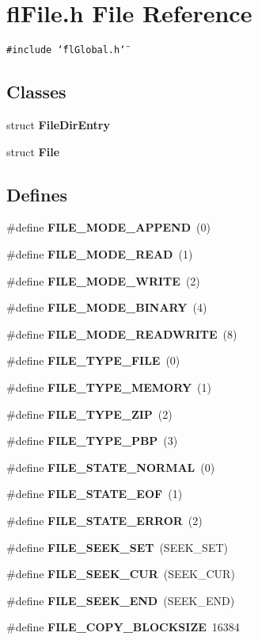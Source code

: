 \section{fl\-File.h File Reference}
\label{flFile_8h}
{\tt \#include \char`\"{}fl\-Global.h\char`\"{}}\par
\subsection*{Classes}
\begin{CompactItemize}
\item 
struct {\bf File\-Dir\-Entry}
\item 
struct {\bf File}
\end{CompactItemize}
\subsection*{Defines}
\begin{CompactItemize}
\item 
\#define {\bf FILE\_\-MODE\_\-APPEND}~(0)
\item 
\#define {\bf FILE\_\-MODE\_\-READ}~(1)
\item 
\#define {\bf FILE\_\-MODE\_\-WRITE}~(2)
\item 
\#define {\bf FILE\_\-MODE\_\-BINARY}~(4)
\item 
\#define {\bf FILE\_\-MODE\_\-READWRITE}~(8)
\item 
\#define {\bf FILE\_\-TYPE\_\-FILE}~(0)
\item 
\#define {\bf FILE\_\-TYPE\_\-MEMORY}~(1)
\item 
\#define {\bf FILE\_\-TYPE\_\-ZIP}~(2)
\item 
\#define {\bf FILE\_\-TYPE\_\-PBP}~(3)
\item 
\#define {\bf FILE\_\-STATE\_\-NORMAL}~(0)
\item 
\#define {\bf FILE\_\-STATE\_\-EOF}~(1)
\item 
\#define {\bf FILE\_\-STATE\_\-ERROR}~(2)
\item 
\#define {\bf FILE\_\-SEEK\_\-SET}~(SEEK\_\-SET)
\item 
\#define {\bf FILE\_\-SEEK\_\-CUR}~(SEEK\_\-CUR)
\item 
\#define {\bf FILE\_\-SEEK\_\-END}~(SEEK\_\-END)
\item 
\#define {\bf FILE\_\-COPY\_\-BLOCKSIZE}~16384
\end{CompactItemize}
